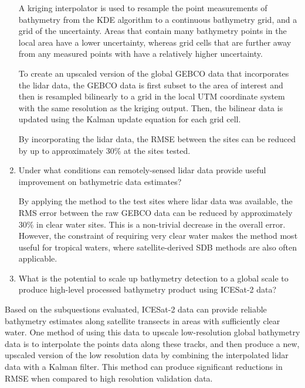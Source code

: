 \begin{enumerate}
    A kriging interpolator is used to resample the point measurements of bathymetry from the KDE algorithm to a continuous bathymetry grid, and a grid of the uncertainty. Areas that contain many bathymetry points in the local area have a lower uncertainty, whereas grid cells that are further away from any measured points with have a relatively higher uncertainty.

    To create an upscaled version of the global GEBCO data that incorporates the lidar data, the GEBCO data is first subset to the area of interest and then is resampled bilinearly to a grid in the local UTM coordinate system with the same resolution as the kriging output. Then, the bilinear data is updated using the Kalman update equation for each grid cell. 

    By incorporating the lidar data, the RMSE between the sites can be reduced by up to approximately 30\% at the sites tested.
    
    \item Under what conditions can remotely-sensed lidar data provide useful improvement on bathymetric data estimates?
    
    By applying the method to the test sites where lidar data was available, the RMS error between the raw GEBCO data can be reduced by approximately 30\% in clear water sites. This is a non-trivial decrease in the overall error. However, the constraint of requiring very clear water makes the method most useful for tropical waters, where satellite-derived SDB methods are also often applicable. 

    \item What is the potential to scale up bathymetry detection to a global scale to produce high-level processed bathymetry product using ICESat-2 data? 




\end{enumerate}

Based on the subquestions evaluated, ICESat-2 data can provide reliable bathymetry estimates along satellite transects in areas with sufficiently clear water. One method of using this data to upscale low-resolution global bathymetry data is to interpolate the points data along these tracks, and then produce a new, upscaled version of the low resolution data by combining the interpolated lidar data with a Kalman filter. This method can produce significant reductions in RMSE when compared to high resolution validation data. 

